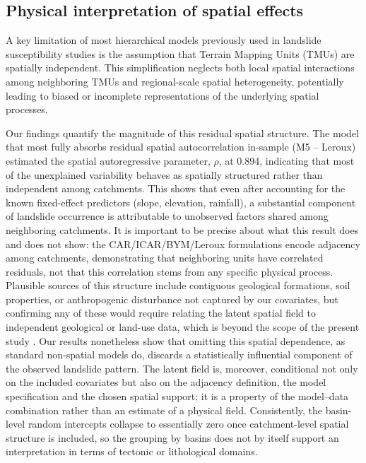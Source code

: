 \documentclass[journal abbreviation, manuscript]{copernicus}
\newcommand{\hl}[1]{#1}
\newcommand{\hlE}[1]{#1}
\begin{document}
\subsection{Physical interpretation of spatial effects}\label{subsec52}

A key limitation of most hierarchical models previously used in landslide susceptibility studies is the assumption that Terrain Mapping Units (TMUs) are spatially independent. 
This simplification neglects both local spatial interactions among neighboring TMUs and regional-scale spatial heterogeneity, potentially leading to biased or incomplete representations of the underlying spatial processes.

\hl{Our findings quantify the magnitude of this residual spatial structure. 
The model} \hlE{that most fully absorbs residual spatial autocorrelation in-sample} \hl{(M5 -- Leroux) estimated the spatial autoregressive parameter, $\rho$, at }\hlE{0.894}\hl{, indicating that most of the unexplained variability behaves as spatially structured rather than independent among catchments. 
This shows that even after accounting for the known fixed-effect predictors (slope, elevation, rainfall), a substantial component of landslide occurrence is attributable to unobserved factors shared among neighboring catchments. 
It is important to be precise about what this result does and does not show: the CAR/ICAR/BYM/Leroux formulations encode adjacency among catchments, demonstrating that neighboring units have correlated residuals, not that this correlation stems from any specific physical process. 
Plausible sources of this structure include contiguous geological formations, soil properties, or anthropogenic disturbance not captured by our covariates, but confirming any of these would require relating the latent spatial field to independent geological or land-use data, which is beyond the scope of the present study} \citep{besag1991bayesian, lawson2018bayesian, morris2019bayesian}
\hlE{. Our results nonetheless show that omitting this spatial dependence, as standard non-spatial models do, discards a statistically influential component of the observed landslide pattern. The latent field is, moreover, conditional not only on the included covariates but also on the adjacency definition, the model specification and the chosen spatial support; it is a property of the model--data combination rather than an estimate of a physical field. Consistently, the basin-level random intercepts collapse to essentially zero once catchment-level spatial structure is included, so the grouping by basins does not by itself support an interpretation in terms of tectonic or lithological domains.}
\end{document}
